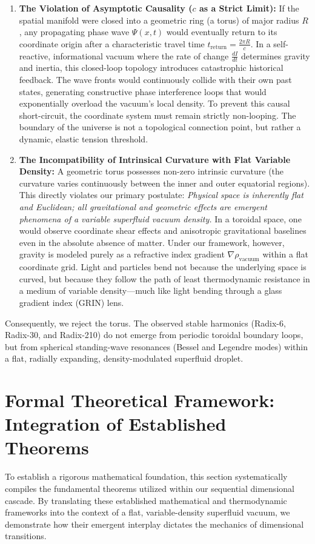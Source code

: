 \documentclass[11pt,a4paper]{article}
\theoremstyle{plain}
\theoremstyle{definition}
\theoremstyle{remark}
\begin{document}
\begin{enumerate}
    \item \textbf{The Violation of Asymptotic Causality ($c$ as a Strict Limit):}
    If the spatial manifold were closed into a geometric ring (a torus) of major radius $R$, any propagating phase wave $\Psi(x, t)$ would eventually return to its coordinate origin after a characteristic travel time $t_{\text{return}} = \frac{2\pi R}{c}$. 
    In a self-reactive, informational vacuum where the rate of change $\frac{dI}{dt}$ determines gravity and inertia, this closed-loop topology introduces catastrophic historical feedback. The wave fronts would continuously collide with their own past states, generating constructive phase interference loops that would exponentially overload the vacuum's local density. To prevent this causal short-circuit, the coordinate system must remain strictly non-looping. The boundary of the universe is not a topological connection point, but rather a dynamic, elastic tension threshold.
    
    \item \textbf{The Incompatibility of Intrinsical Curvature with Flat Variable Density:}
    A geometric torus possesses non-zero intrinsic curvature (the curvature varies continuously between the inner and outer equatorial regions). This directly violates our primary postulate: \textit{Physical space is inherently flat and Euclidean; all gravitational and geometric effects are emergent phenomena of a variable superfluid vacuum density.}
    In a toroidal space, one would observe coordinate shear effects and anisotropic gravitational baselines even in the absolute absence of matter. Under our framework, however, gravity is modeled purely as a refractive index gradient $\nabla \rho_{\text{vacuum}}$ within a flat coordinate grid. Light and particles bend not because the underlying space is curved, but because they follow the path of least thermodynamic resistance in a medium of variable density—much like light bending through a glass gradient index (GRIN) lens.
\end{enumerate}

Consequently, we reject the torus. The observed stable harmonics (Radix-6, Radix-30, and Radix-210) do not emerge from periodic toroidal boundary loops, but from spherical standing-wave resonances (Bessel and Legendre modes) within a flat, radially expanding, density-modulated superfluid droplet.

\newpage
\section{Formal Theoretical Framework: Integration of Established Theorems}
To establish a rigorous mathematical foundation, this section systematically compiles the fundamental theorems utilized within our sequential dimensional cascade. By translating these established mathematical and thermodynamic frameworks into the context of a flat, variable-density superfluid vacuum, we demonstrate how their emergent interplay dictates the mechanics of dimensional transitions.
\end{document}
